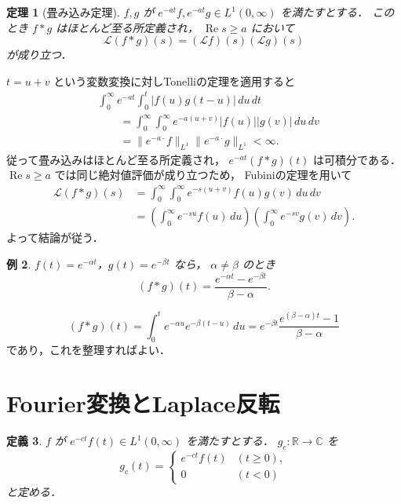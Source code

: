 \documentclass[a5paper,10pt,onecolumn]{jsarticle}
\makeatletter
\theoremstyle{mathnotetheorem}
\newtheorem{theorem}{定理}[section]
\newtheorem{definition}[theorem]{定義}
\newtheorem{example}[theorem]{例}
\renewcommand{\proofname}{証明}
\renewenvironment{proof}[1][\proofname]{%
  \par\pushQED{\qed}\normalfont\topsep4\p@\@plus2\p@\relax
  \trivlist\item[\hskip\labelsep\bfseries #1]\ignorespaces
}{\popQED\endtrivlist\@endpefalse}
\newcommand{\norm}[1]{\lVert #1\rVert}
\makeatother
\begin{document}
\begin{theorem}[畳み込み定理]\label{thm:convolution}
$f,g$ が
$e^{-at}f,e^{-at}g\in L^1(0,\infty)$ を満たすとする．
このとき $f*g$ はほとんど至る所定義され，
$\operatorname{Re}s\ge a$ において
\[
 \mathcal L(f*g)(s)
 =(\mathcal Lf)(s)(\mathcal Lg)(s)
\]
が成り立つ．
\end{theorem}
\begin{proof}
$t=u+v$ という変数変換に対しTonelliの定理を適用すると
\begin{align*}
 &\int_0^\infty e^{-at}\int_0^t
 |f(u)g(t-u)|\,du\,dt\\
 &\qquad=\int_0^\infty\int_0^\infty
 e^{-a(u+v)}|f(u)||g(v)|\,du\,dv\\
 &\qquad=\norm{e^{-a\cdot}f}_{L^1}
 \norm{e^{-a\cdot}g}_{L^1}<\infty.
\end{align*}
従って畳み込みはほとんど至る所定義され，
$e^{-at}(f*g)(t)$ は可積分である．
$\operatorname{Re}s\ge a$ では同じ絶対値評価が成り立つため，
Fubiniの定理を用いて
\begin{align*}
 \mathcal L(f*g)(s)
 &=\int_0^\infty\int_0^\infty
 e^{-s(u+v)}f(u)g(v)\,du\,dv\\
 &=\left(\int_0^\infty e^{-su}f(u)\,du\right)
   \left(\int_0^\infty e^{-sv}g(v)\,dv\right).
\end{align*}
よって結論が従う．
\end{proof}

\begin{example}
$f(t)=e^{-\alpha t}$，$g(t)=e^{-\beta t}$ なら，
$\alpha\ne\beta$ のとき
\[
 (f*g)(t)=
 \frac{e^{-\alpha t}-e^{-\beta t}}{\beta-\alpha}.
\]
\end{example}
\begin{proof}
\[
 (f*g)(t)=\int_0^t
 e^{-\alpha u}e^{-\beta(t-u)}\,du
 =e^{-\beta t}
 \frac{e^{(\beta-\alpha)t}-1}{\beta-\alpha}
\]
であり，これを整理すればよい．
\end{proof}

\section{Fourier変換とLaplace反転}

\begin{definition}
$f$ が $e^{-ct}f(t)\in L^1(0,\infty)$ を満たすとする．
$g_c:\mathbb R\to\mathbb C$ を
\[
 g_c(t)=\begin{cases}
 e^{-ct}f(t)&(t\ge0),\\
 0&(t<0)
 \end{cases}
\]
と定める．
\end{definition}
\end{document}
